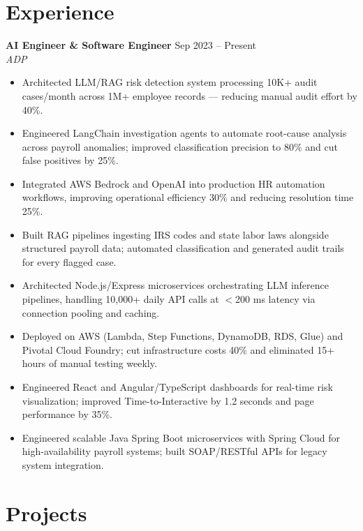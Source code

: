 \documentclass[10pt, letterpaper]{article}
\newcommand{\resumeEntry}[3]{%
  \vspace{4pt}%
  \textbf{#1} \hfill #3 \\
  \textit{\small #2}%
  \vspace{1pt}%
}
\begin{document}
\section{Experience}

\resumeEntry{AI Engineer \& Software Engineer}{ADP}{Sep 2023 -- Present}
\begin{itemize}
  \item Architected LLM/RAG risk detection system processing 10K+ audit cases/month across 1M+ employee records — reducing manual audit effort by 40\%.
  \item Engineered LangChain investigation agents to automate root-cause analysis across payroll anomalies; improved classification precision to 80\% and cut false positives by 25\%.
  \item Integrated AWS Bedrock and OpenAI into production HR automation workflows, improving operational efficiency 30\% and reducing resolution time 25\%.
  \item Built RAG pipelines ingesting IRS codes and state labor laws alongside structured payroll data; automated classification and generated audit trails for every flagged case.
  \item Architected Node.js/Express microservices orchestrating LLM inference pipelines, handling 10{,}000+ daily API calls at $<$200 ms latency via connection pooling and caching.
  \item Deployed on AWS (Lambda, Step Functions, DynamoDB, RDS, Glue) and Pivotal Cloud Foundry; cut infrastructure costs 40\% and eliminated 15+ hours of manual testing weekly.
  \item Engineered React and Angular/TypeScript dashboards for real-time risk visualization; improved Time-to-Interactive by 1.2 seconds and page performance by 35\%.
  \item Engineered scalable Java Spring Boot microservices with Spring Cloud for high-availability payroll systems; built SOAP/RESTful APIs for legacy system integration.
\end{itemize}

\section{Projects}
\end{document}
